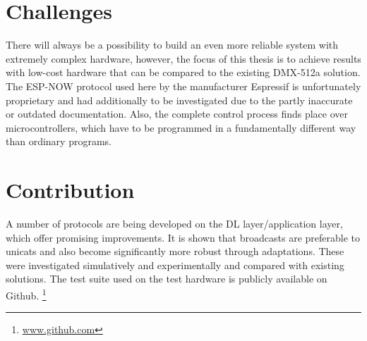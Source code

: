 \section*{Challenges}

There will always be a possibility to build an even more reliable system with extremely complex hardware,
however, the focus of this thesis is to achieve results with low-cost hardware that can be compared 
to the existing DMX-512a solution.
The ESP-NOW protocol used here by the manufacturer Espressif is unfortunately proprietary
and had additionally to be investigated due to the partly inaccurate or outdated documentation.
Also, the complete control process finds place over microcontrollers, 
which have to be programmed in a fundamentally different way than ordinary programs.

\section*{Contribution}

A number of protocols are being developed on the DL layer/application layer,
which offer promising improvements.
It is shown that broadcasts are preferable to unicats
and also become significantly more robust through adaptations.
These were investigated simulatively and experimentally and compared with existing solutions.
The test suite used on the test hardware is publicly available on Github.
\footnote{\url{www.github.com}}

